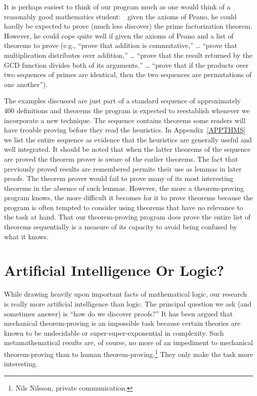\documentclass[10pt]{book}
\begin{document}
It is perhaps easiest to think of our program much as one would think of a
reasonably good mathematics student:~~given the axioms of
Peano, he could hardly be expected to prove (much less discover) the
prime factorization theorem.  However, he could  cope quite well if given
the axioms of Peano and a list of theorems to prove
(e.g., ``prove that addition is commutative,'' \ldots{} ``prove that multiplication distributes over
addition,'' \ldots{} ``prove that the result returned by the GCD function divides both of
its arguments,'' \ldots{} ``prove that if the products over two sequences of
primes are identical, then the two sequences are
permutations of one another'').

The examples discussed are just part of a standard sequence of approximately
400 definitions and theorems the program is expected to reestablish whenever
we incorporate a new technique.  The sequence contains theorems some readers
will have trouble proving before they read the heuristics.
In Appendix~\ref{APPTHMS} we list the entire sequence as evidence
that the heuristics are generally useful and well integrated.  It should
be noted that when the latter theorems of the sequence are proved
the theorem prover is aware of the earlier theorems.   The fact that previously proved results are remembered permits
their use as lemmas in later proofs.  The theorem prover would fail to prove
many of its most interesting theorems in the absence of such lemmas.  However, the more a theorem-proving program knows, the more
difficult it becomes for it to prove theorems because the program
is often tempted to consider using theorems that have no relevance
to the task at hand.  That our theorem-proving program does prove
the entire list of theorems sequentially is a measure of its capacity
to avoid being confused by what it knows.

\section{Artificial Intelligence Or Logic?}
While drawing heavily upon important facts of mathematical logic, our research
is really more artificial intelligence than logic.   The principal question
we ask (and sometimes answer) is ``how do we discover proofs?''
It has been argued that mechanical theorem-proving is an impossible task
because certain theories are known to be undecidable or super-super-exponential in complexity.
Such metamathematical results are, of course, no more of an impediment to
mechanical theorem-proving than to human theorem-proving.\footnote{Nils Nilsson, private communication.}  They only
make the task more interesting.
\end{document}
